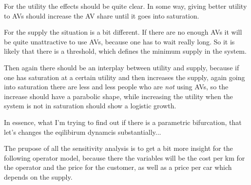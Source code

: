 For the utility the effects should be quite clear. In some way, giving better
utility to AVs should increase the AV share until it goes into saturation.

For the supply the situation is a bit different. If there are no enough AVs it
will be quite unattractive to use AVs, because one has to wait really long. So
it is likely that there is a threshold, which defines the minimum supply in the
system.

Then again there should be an interplay between utility and supply, because
if one has saturation at a certain utility and then increases the supply, again
going into saturation there are less and less people who are \textit{not} using
AVs, so the increase should have a parabolic shape, while increasing the utility
when the system is not in saturation should show a logistic growth.

In essence, what I'm trying to find out if there is a parametric bifurcation, that
let's changes the eqilibirum dynamcis substantially...

The prupose of all the sensitivity analysis is to get a bit more insight for the
following operator model, because there the variables will be the cost per km
for the operator and the price for the customer, as well as a price per car which
depends on the supply. 
